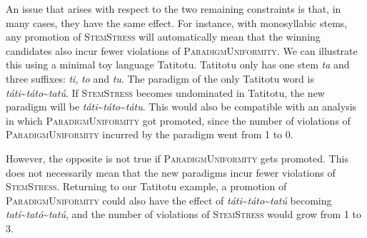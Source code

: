 \documentclass[output=paper,nonflat,colorlinks,citecolor=brown,newtxmath]{langsci/langscibook}
\begin{document}
An issue that arises with respect to the two remaining constraints is that, in many cases, they have the same effect. For instance, with monosyllabic stems, any promotion of \textsc{StemStress} will automatically mean that the winning candidates also incur fewer violations of \textsc{ParadigmUniformity}. We can illustrate this using a minimal toy language Tatitotu. Tatitotu only has one stem \textit{ta} and three  suffixes: \textit{ti}, \textit{to} and \textit{tu}. The paradigm of the only Tatitotu word is \textit{táti}\textasciitilde{}\textit{táto}\textasciitilde{}\textit{tatú}. If \textsc{StemStress} becomes undominated in Tatitotu, the new paradigm will be \textit{táti}\textasciitilde{}\textit{táto}\textasciitilde{}\textit{tátu}. This  would also be compatible with an analysis in which \textsc{ParadigmUniformity} got promoted, since the number of violations of \textsc{ParadigmUniformity} incurred by the paradigm went from 1 to 0.

However, the opposite is not true if \textsc{ParadigmUniformity} gets promoted. This does not necessarily mean that the new paradigms incur fewer violations of \textsc{StemStress}. Returning to our Tatitotu example, a promotion of \textsc{ParadigmUniformity} could also have the effect of \textit{táti}\textasciitilde{}\textit{táto}\textasciitilde{}\textit{tatú} becoming \textit{tatí}\textasciitilde{}\textit{tató}\textasciitilde{}\textit{tatú}, and the number of violations of \textsc{StemStress} would grow from 1 to 3.
\end{document}
